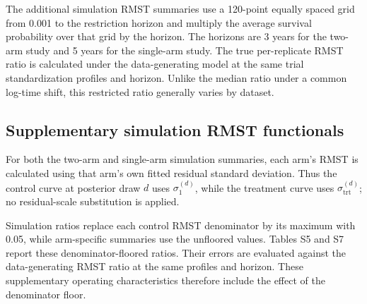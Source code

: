 The additional simulation RMST summaries use a 120-point equally spaced grid from 0.001 to the restriction horizon and multiply the average survival probability over that grid by the horizon. The horizons are 3 years for the two-arm study and 5 years for the single-arm study. The true per-replicate RMST ratio is calculated under the data-generating model at the same trial standardization profiles and horizon. Unlike the median ratio under a common log-time shift, this restricted ratio generally varies by dataset.

\subsection{Supplementary simulation RMST functionals}\label{sec:D.5}
For both the two-arm and single-arm simulation summaries, each arm's RMST is calculated using that arm's own fitted residual standard deviation. Thus the control curve at posterior draw $d$ uses $\sigma_{1}^{(d)}$, while the treatment curve uses $\sigma_{\mathrm{trt}}^{(d)}$; no residual-scale substitution is applied.

Simulation ratios replace each control RMST denominator by its maximum with 0.05, while arm-specific summaries use the unfloored values. Tables S5 and S7 report these denominator-floored ratios. Their errors are evaluated against the data-generating RMST ratio at the same profiles and horizon. These supplementary operating characteristics therefore include the effect of the denominator floor.
